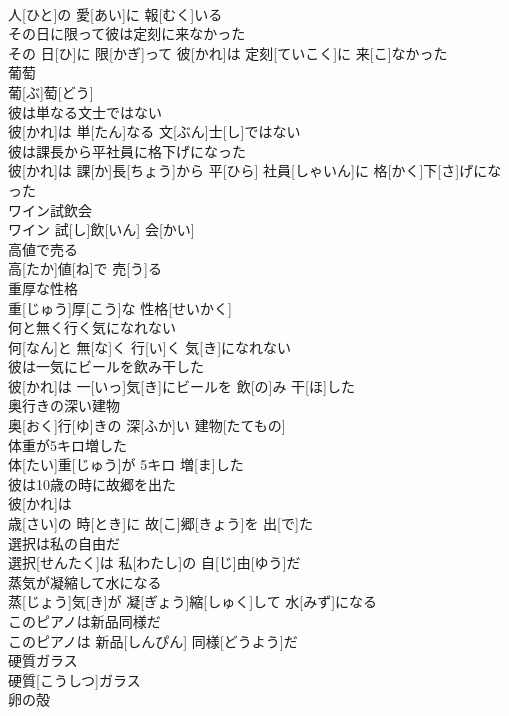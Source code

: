 \documentclass[8pt]{extreport}
\begin{document}
\begin{CJK}{UTF8}{min}
\\	人[ひと]の 愛[あい]に 報[むく]いる
\\	その日に限って彼は定刻に来なかった	
\\	その 日[ひ]に 限[かぎ]って 彼[かれ]は 定刻[ていこく]に 来[こ]なかった
\\	葡萄	
\\	葡[ぶ]萄[どう]
\\	彼は単なる文士ではない	
\\	彼[かれ]は 単[たん]なる 文[ぶん]士[し]ではない
\\	彼は課長から平社員に格下げになった	
\\	彼[かれ]は 課[か]長[ちょう]から 平[ひら] 社員[しゃいん]に 格[かく]下[さ]げになった
\\	ワイン試飲会	
\\	ワイン 試[し]飲[いん] 会[かい]
\\	高値で売る	
\\	高[たか]値[ね]で 売[う]る
\\	重厚な性格	
\\	重[じゅう]厚[こう]な 性格[せいかく]
\\	何と無く行く気になれない	
\\	何[なん]と 無[な]く 行[い]く 気[き]になれない
\\	彼は一気にビールを飲み干した	
\\	彼[かれ]は 一[いっ]気[き]にビールを 飲[の]み 干[ほ]した
\\	奥行きの深い建物	
\\	奥[おく]行[ゆ]きの 深[ふか]い 建物[たてもの]
\\	体重が5キロ増した	
\\	体[たい]重[じゅう]が 5キロ 増[ま]した
\\	彼は10歳の時に故郷を出た	
\\	彼[かれ]は 
\\	歳[さい]の 時[とき]に 故[こ]郷[きょう]を 出[で]た
\\	選択は私の自由だ	
\\	選択[せんたく]は 私[わたし]の 自[じ]由[ゆう]だ
\\	蒸気が凝縮して水になる	
\\	蒸[じょう]気[き]が 凝[ぎょう]縮[しゅく]して 水[みず]になる
\\	このピアノは新品同様だ	
\\	このピアノは 新品[しんぴん] 同様[どうよう]だ
\\	硬質ガラス	
\\	硬質[こうしつ]ガラス 
\\	卵の殻	

\end{CJK}
\end{document}
